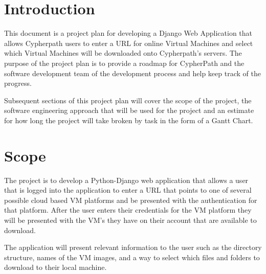 \documentclass{article}
\title{}
\author{}
\date{}
\begin{document}
    

    \tableofcontents
    \listoffigures

    \newpage
    \begin{versionhistory}
    \end{versionhistory}
    \newpage


    \section{Introduction}
    This document is a project plan for developing a Django Web Application that allows Cypherpath users to enter
    a URL for online Virtual Machines and select which Virtual Machines will be downloaded onto Cypherpath's 
    servers. The purpose of the project plan is to provide a roadmap for CypherPath and the software development
    team of the development process and help keep track of the progress.

    Subsequent sections of this project plan will cover the scope of the project, the software engineering
    approach that will be used for the project and an estimate for how long the project will take broken by task
    in the form of a Gantt Chart.

    \section{Scope}
    The project is to develop a Python-Django web application that allows a user that is logged into the application to enter a URL that points to one of several
    possible cloud based VM platforms and be presented with the authentication for that platform. After the user enters their credentials for the VM platform 
    they will be presented with the VM's they have on their account that are available to download.
    
    The application will present relevant information to the user such as the directory structure, names of the VM images, and a way to select which files and folders
    to download to their local machine.
\end{document}
